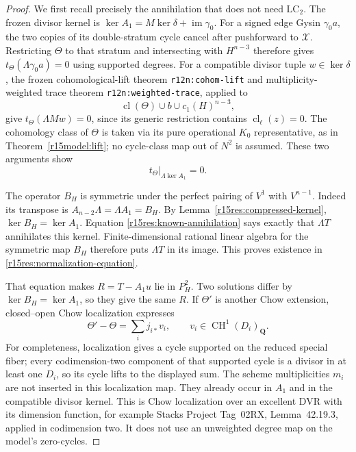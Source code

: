\begin{proof}
We first recall precisely the annihilation that does not need
$\mathrm{LC}_2$.  The frozen divisor kernel is
$\ker A_1=M\ker\delta+\operatorname{im}\gamma_0$.
For a signed edge Gysin $\gamma_0a$, the two copies of its
double-stratum cycle cancel after pushforward to $\mathcal X$.
Restricting $\Theta$ to that stratum and intersecting with
$H^{n-3}$ therefore gives
$t_\Theta(\Lambda\gamma_0a)=0$ using supported degrees.
For a compatible divisor tuple $w\in\ker\delta$, the frozen
cohomological-lift theorem \texttt{r12n:cohom-lift} and
multiplicity-weighted trace theorem
\texttt{r12n:weighted-trace}, applied to
\[
       \operatorname{cl}(\Theta)\cup b\cup c_1(H)^{n-3},
\]
give $t_\Theta(\Lambda Mw)=0$, since its generic restriction
contains $\operatorname{cl}_\ell(z)=0$.
The cohomology class of $\Theta$ is taken via its pure
operational $K_0$ representative, as in
Theorem~\ref{r15model:lift}; no cycle-class map out of $N^2$
is assumed.  These two arguments show
\[
                     t_\Theta|_{\Lambda\ker A_1}=0.
\tag{NR15.15}\label{r15res:known-annihilation}
\]

The operator $B_H$ is symmetric under the perfect pairing
of $V^1$ with $V^{n-1}$.  Indeed its transpose is
$A_{n-2}\Lambda=\Lambda A_1=B_H$.
By Lemma~\ref{r15res:compressed-kernel},
$\ker B_H=\ker A_1$.
Equation \eqref{r15res:known-annihilation} says exactly that
$\Lambda T$ annihilates this kernel.  Finite-dimensional
rational linear algebra for the symmetric map $B_H$ therefore
puts $\Lambda T$ in its image.  This proves existence in
\eqref{r15res:normalization-equation}.

That equation makes $R=T-A_1u$ lie in $P_H^2$.
Two solutions differ by $\ker B_H=\ker A_1$, so they give
the same $R$.  If $\Theta'$ is another Chow extension,
closed--open Chow localization expresses
\[
                   \Theta'-\Theta=\sum_i j_{i*}v_i,
                       \qquad v_i\in\operatorname{CH}^1(D_i)_{\mathbf Q}.
\tag{NR15.16}\label{r15res:localization}
\]
For completeness, localization gives a cycle supported on
the reduced special fiber; every codimension-two component
of that supported cycle is a divisor in at least one $D_i$,
so its cycle lifts to the displayed sum.  The scheme
multiplicities $m_i$ are not inserted in this localization
map.  They already occur in $A_1$ and in the compatible
divisor kernel.  This is Chow localization over an excellent
DVR with its dimension function, for example Stacks Project
Tag~02RX, Lemma~42.19.3, applied in codimension two.
It does not use an unweighted degree map on the model's
zero-cycles.


\end{proof}
